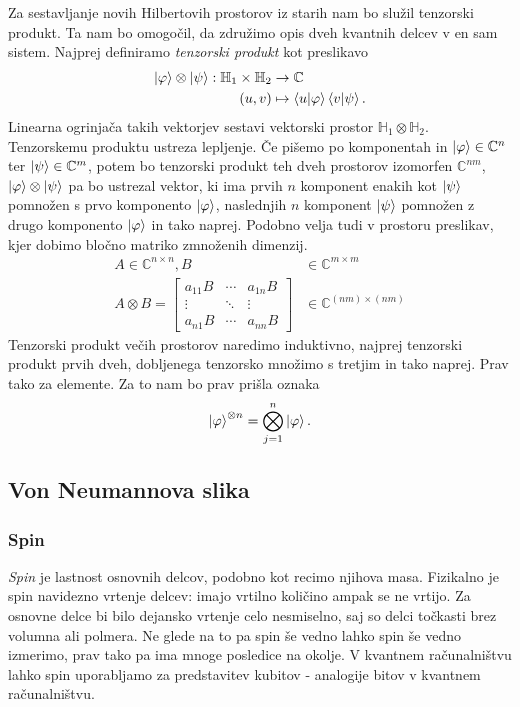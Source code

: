 \documentclass[mat1]{fmfdelo}
\newcommand{\C}{\mathbb C}
\newcommand{\Hb}{\mathbb H}
\begin{document}
Za sestavljanje novih Hilbertovih prostorov iz starih nam bo služil tenzorski produkt. Ta nam bo omogočil, da združimo opis dveh kvantnih delcev v en sam sistem. Najprej definiramo \emph{tenzorski produkt} kot preslikavo
\begin{align*}
    \ket\varphi \otimes \ket\psi : \Hb_1 \times \Hb_2 &\to \mathbb C\\
    (u,v) &\mapsto \braket{u}{\varphi} \braket{v}{\psi}.
\end{align*}
Linearna ogrinjača takih vektorjev sestavi vektorski prostor \(\Hb_1 \otimes \Hb_2\). Tenzorskemu produktu ustreza lepljenje. Če pišemo po komponentah in \(\ket\varphi\in\C^n\) ter \(\ket\psi\in\C^m\), potem bo tenzorski produkt teh dveh prostorov izomorfen \(\C^{nm}\), \(\ket\varphi\otimes\ket\psi\) pa bo ustrezal vektor, ki ima prvih \(n\) komponent enakih kot \(\ket\psi\) pomnožen s prvo komponento \(\ket\varphi\), naslednjih \(n\) komponent \(\ket\psi\) pomnožen z drugo komponento \(\ket\varphi\) in tako naprej. Podobno velja tudi v prostoru preslikav, kjer dobimo bločno matriko zmnoženih dimenzij.
\begin{align*}
    A\in \C^{n\times n}, B&\in\C^{m\times m}\\
    A\otimes B = \begin{bmatrix}
        a_{11}B&\cdots&a_{1n}B\\
        \vdots&\ddots&\vdots\\
        a_{n1}B&\cdots&a_{nn}B
    \end{bmatrix}&\in \C^{(nm)\times (nm)}
\end{align*}
Tenzorski produkt večih prostorov naredimo induktivno, najprej tenzorski produkt prvih dveh, dobljenega tenzorsko množimo s tretjim in tako naprej. Prav tako za elemente. Za to nam bo prav prišla oznaka
\begin{align*}
    \ket{\varphi}^{\otimes n} = \bigotimes_{j=1}^n \ket\varphi.
\end{align*}

\subsection{Von Neumannova slika}
\subsubsection{Spin}
\emph{Spin} je lastnost osnovnih delcov, podobno kot recimo njihova masa. Fizikalno je spin navidezno vrtenje delcev: imajo vrtilno količino ampak se ne vrtijo. Za osnovne delce bi bilo dejansko vrtenje celo nesmiselno, saj so delci točkasti brez volumna ali polmera. Ne glede na to pa spin še vedno lahko spin še vedno izmerimo, prav tako pa ima mnoge posledice na okolje. V kvantnem računalništvu lahko spin uporabljamo za predstavitev kubitov - analogije bitov v kvantnem računalništvu. 
\end{document}
